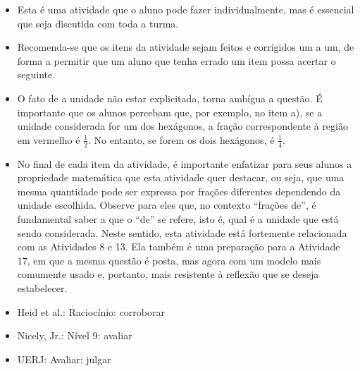 \begin{multicols}{2}
\begin{itemize} %
    \item       Esta é uma atividade que o aluno pode fazer individualmente, mas é essencial que seja discutida com toda a turma.
    \item       Recomenda-se que os itens da atividade sejam feitos e corrigidos um a um, de forma a permitir que um aluno que tenha errado um item possa acertar o seguinte.
    \item       O fato de a unidade não estar explicitada, torna ambígua a questão. É importante que os alunos percebam que, por exemplo, no item a), se a unidade considerada for um dos hexágonos, a fração correspondente à região em vermelho é $\frac{1}{2}$. No entanto, se forem os dois hexágonos, é $\frac{1}{4}$.
    \item       No final de cada item da atividade, é importante enfatizar para seus alunos a propriedade matemática que esta atividade quer destacar, ou seja, que uma mesma quantidade pode ser expressa por frações diferentes dependendo da unidade escolhida. Observe para eles que, no contexto       ``frações de'', é fundamental saber a que o       ``de''     se refere, isto é, qual é a unidade que está sendo considerada. Neste sentido, esta atividade está fortemente relacionada com as Atividades 8 e 13. Ela também é uma preparação para a Atividade 17, em que a mesma questão é posta, mas agora com um modelo mais comumente usado e, portanto, mais resistente à reflexão que se deseja estabelecer.
\end{itemize} %


  \vspace{.1cm}

 \vspace{.1cm}
\begin{itemize} %
    \item       Heid et al.: Raciocínio: corroborar
    \item       Nicely, Jr.: Nível 9: avaliar
    \item       UERJ: Avaliar: julgar
\end{itemize} %

\def \tripinha{ (30:4) -- (90:4) -- (150:4)--(210:4)--(270:4)--(330:4) [shift={({4*sqrt(3)},0)}] --(270:4) -- (330:4) -- (30:4) -- (90:4)--(150:4)--cycle;}


\def \tripa{ (30:4) -- (90:4) -- (150:4)--(210:4)--(270:4)--(330:4) [shift={({4*sqrt(3)},0)}] --(270:4) -- (330:4) [shift={({4*sqrt(3)},0)}]--  (270:4) -- (330:4) -- (30:4) -- (90:4)--(150:4) [shift={({-4*sqrt(3)},0)}] -- (90:4) -- (150:4)--cycle;}


\end{multicols}

